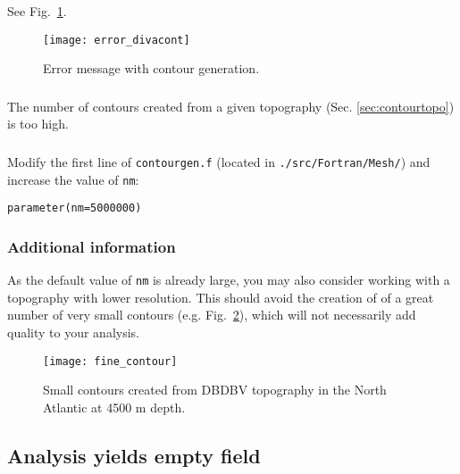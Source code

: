 See Fig.~\ref{error:cont}.

\begin{figure}[htpb]
\centering
\texttt{[image: error\_divacont]}
\caption{Error message with contour generation.\label{error:cont}}
\end{figure}

\subsubsection{\question}

The number of contours created from a given topography (Sec. \ref{sec:contourtopo}) is too high. 

\subsubsection{\answer}

Modify the first line of \texttt{contourgen.f} (located in \texttt{./src/Fortran/Mesh/}) and increase the value of \texttt{nm}:
\begin{verbatim}
parameter(nm=5000000)
\end{verbatim}

\subsubsection{Additional information}

As the default value of \texttt{nm} is already large, you may also consider working with a topography with lower resolution. This should avoid the creation of of a great number of very small contours (e.g. Fig.~\ref{fig:smallcont}), which will not necessarily add quality to your analysis.


\begin{figure}[htpb]
\centering
\parbox{.65\textwidth}{
\texttt{[image: fine\_contour]}
}\parbox{.35\textwidth}{
\caption[Small contours]{Small contours created from DBDBV topography in the North Atlantic at 4500 m depth\label{fig:smallcont}.}
}
\end{figure}
 


%





\subsection{Analysis yields empty field}


